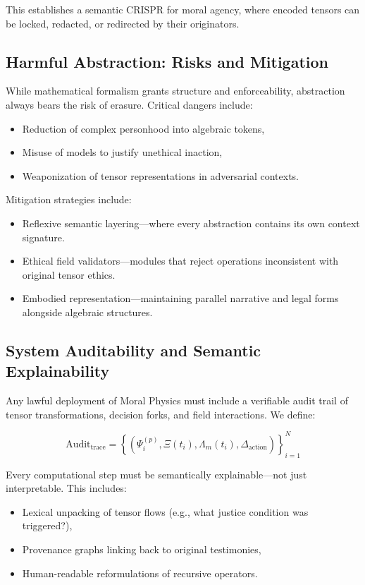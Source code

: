 \documentclass{article}
\theoremstyle{plain}
\theoremstyle{claimstyle}
\begin{document}
This establishes a semantic CRISPR for moral agency, where encoded tensors can be locked, redacted, or redirected by their originators.

\subsection{Harmful Abstraction: Risks and Mitigation}

While mathematical formalism grants structure and enforceability, abstraction always bears the risk of erasure. Critical dangers include:

\begin{itemize}
    \item Reduction of complex personhood into algebraic tokens,
    \item Misuse of models to justify unethical inaction,
    \item Weaponization of tensor representations in adversarial contexts.
\end{itemize}

Mitigation strategies include:

\begin{itemize}
    \item Reflexive semantic layering—where every abstraction contains its own context signature.
    \item Ethical field validators—modules that reject operations inconsistent with original tensor ethics.
    \item Embodied representation—maintaining parallel narrative and legal forms alongside algebraic structures.
\end{itemize}

\subsection{System Auditability and Semantic Explainability}

Any lawful deployment of Moral Physics must include a verifiable audit trail of tensor transformations, decision forks, and field interactions. We define:

\[
\text{Audit}_{\text{trace}} = \left\{ \left( \Psi^{(p)}_i, \Xi(t_i), \Lambda_m(t_i), \Delta_{\text{action}} \right) \right\}_{i=1}^N
\]

Every computational step must be semantically explainable—not just interpretable. This includes:

\begin{itemize}
    \item Lexical unpacking of tensor flows (e.g., what justice condition was triggered?),
    \item Provenance graphs linking back to original testimonies,
    \item Human-readable reformulations of recursive operators.
\end{itemize}
\end{document}
